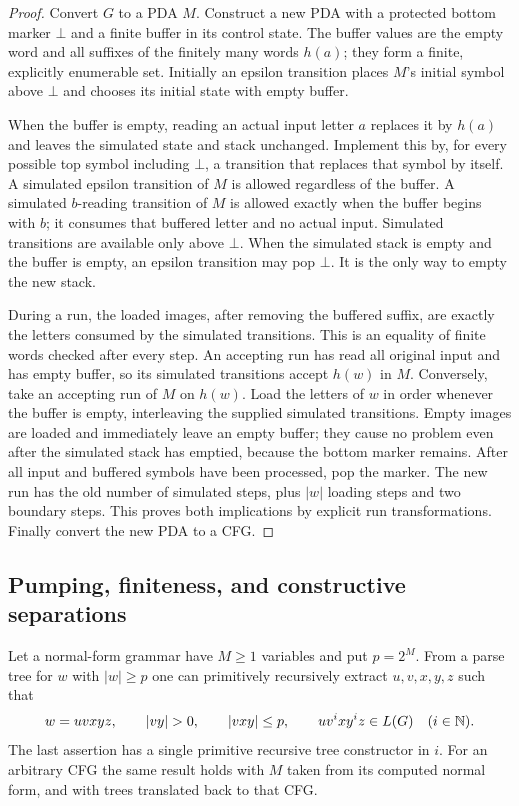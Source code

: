 \begin{proof}
Convert $G$ to a PDA $M$.  Construct a new PDA with a protected bottom marker
$\bot$ and a finite buffer in its control state.  The buffer values are
the empty word and all suffixes of the finitely many words $h(a)$; they
form a finite, explicitly enumerable set.  Initially an epsilon transition
places $M$'s initial symbol above $\bot$ and chooses its initial state with
empty buffer.

When the buffer is empty, reading an actual input letter $a$ replaces it
by $h(a)$ and leaves the simulated state and stack unchanged.  Implement
this by, for every possible top symbol including $\bot$, a transition
that replaces that symbol by itself.  A simulated epsilon transition of
$M$ is allowed regardless of the buffer.  A simulated $b$-reading transition
of $M$ is allowed exactly when the buffer begins with $b$; it consumes
that buffered letter and no actual input.  Simulated transitions are
available only above $\bot$.  When the simulated stack is empty and the
buffer is empty, an epsilon transition may pop $\bot$.  It is the only
way to empty the new stack.

During a run, the loaded images, after removing the buffered suffix,
are exactly the letters consumed by the simulated transitions.  This is
an equality of finite words checked after every step.  An accepting run
has read all original input and has empty buffer, so its simulated
transitions accept $h(w)$ in $M$.  Conversely, take an accepting run of
$M$ on $h(w)$.  Load the letters of $w$ in order whenever the buffer is
empty, interleaving the supplied simulated transitions.  Empty images
are loaded and immediately leave an empty buffer; they cause no problem
even after the simulated stack has emptied, because the bottom marker
remains.  After all input and buffered symbols have been processed, pop
the marker.  The new run has the old number of simulated steps, plus
$|w|$ loading steps and two boundary steps.  This proves both implications
by explicit run transformations.  Finally convert the new PDA to a CFG.
\end{proof}

\subsection{Pumping, finiteness, and constructive separations}

\begin{theorem}
\label{cf:pumping}
Let a normal-form grammar have $M\geq1$ variables and put $p=2^M$.
From a parse tree for $w$ with $|w|\geq p$ one can primitively recursively
extract $u,v,x,y,z$ such that
\[
 w=uvxyz,\qquad |vy|>0,\qquad |vxy|\leq p,
 \qquad uv^i x y^i z\in L(G)\quad(i\in\N).
\]
The last assertion has a single primitive recursive tree constructor in
$i$.  For an arbitrary CFG the same result holds with $M$ taken from
its computed normal form, and with trees translated back to that CFG.
\end{theorem}

